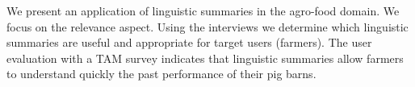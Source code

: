 
We present an application of linguistic summaries in the agro-food domain. We focus on the relevance aspect. Using the interviews we  determine which linguistic summaries are useful and appropriate for target users (farmers). The user evaluation with a TAM survey indicates that linguistic summaries allow farmers to understand quickly the past performance of their pig barns.


